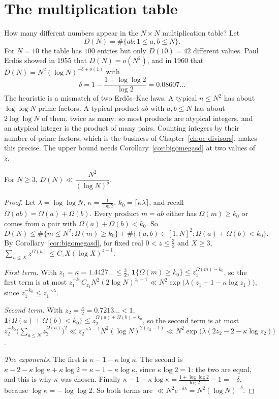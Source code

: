 \section{The multiplication table}\label{sec:table}

How many different numbers appear in the $N\times N$ multiplication table? Let
\[
D(N)=\#\{ab:1\le a,b\le N\}.
\]
For $N=10$ the table has $100$ entries but only $D(10)=42$ different values. Paul Erd\H{o}s showed in 1955 that $D(N)=o(N^2)$, and in 1960 that $D(N)=N^2(\log N)^{-\delta+o(1)}$ with
\[
\delta=1-\frac{1+\log\log2}{\log2}=0.08607\ldots
\]
The heuristic is a mismatch of two Erd\H{o}s--Kac laws. A typical $n\le N^2$ has about $\log\log N$ prime factors. A typical product $ab$ with $a,b\le N$ has about $2\log\log N$ of them, twice as many: so most products are atypical integers, and an atypical integer is the product of many pairs. Counting integers by their number of prime factors, which is the business of Chapter~\ref{ch:oc-divisors}, makes this precise. The upper bound needs Corollary~\ref{cor:bigomegasd} at two values of $z$.

\begin{theorem}[Erd\H{o}s, 1960]\label{thm:multtable}
For $N\ge3$, $D(N)\ll\dfrac{N^2}{(\log N)^\delta}$.
\end{theorem}
\begin{proof}
Let $\lambda=\log\log N$, $\kappa=\frac1{\log2}$, $k_0=\lceil\kappa\lambda\rceil$, and recall $\Omega(ab)=\Omega(a)+\Omega(b)$. Every product $m=ab$ either has $\Omega(m)\ge k_0$ or comes from a pair with $\Omega(a)+\Omega(b)<k_0$. So
\[
D(N)\le\#\{m\le N^2:\Omega(m)\ge k_0\}+\#\{(a,b)\in[1,N]^2:\Omega(a)+\Omega(b)<k_0\}.
\]
By Corollary~\ref{cor:bigomegasd}, for fixed real $0<z\le\frac32$ and $X\ge3$, $\sum_{n\le X}z^{\Omega(n)}\le C_zX(\log X)^{z-1}$.

\emph{First term.} With $z_1=\kappa=1.4427\ldots\le\frac32$, $\mathbf 1\{\Omega(m)\ge k_0\}\le z_1^{\Omega(m)-k_0}$, so the first term is at most $z_1^{-k_0}C_{z_1}N^2(2\log N)^{z_1-1}\ll N^2\exp\bigl(\lambda(z_1-1-\kappa\log z_1)\bigr)$, since $z_1^{-k_0}\le z_1^{-\kappa\lambda}$.

\emph{Second term.} With $z_2=\frac\kappa2=0.7213\ldots<1$, $\mathbf 1\{\Omega(a)+\Omega(b)<k_0\}\le z_2^{\Omega(a)+\Omega(b)-k_0}$, so the second term is at most $z_2^{-k_0}\bigl(\sum_{a\le N}z_2^{\Omega(a)}\bigr)^2\ll z_2^{-\kappa\lambda-1}N^2(\log N)^{2(z_2-1)}\ll N^2\exp\bigl(\lambda(2z_2-2-\kappa\log z_2)\bigr)$.

\emph{The exponents.} The first is $\kappa-1-\kappa\log\kappa$. The second is $\kappa-2-\kappa\log\kappa+\kappa\log2=\kappa-1-\kappa\log\kappa$, since $\kappa\log2=1$: the two are equal, and this is why $\kappa$ was chosen. Finally $\kappa-1-\kappa\log\kappa=\frac{1+\log\log2}{\log2}-1=-\delta$, because $\log\kappa=-\log\log2$. So both terms are $\ll N^2e^{-\delta\lambda}=N^2(\log N)^{-\delta}$.
\end{proof}

